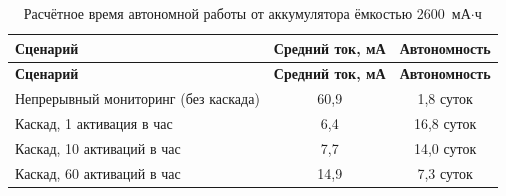 \begin{longtable}{|p{6cm}|c|c|}
	\caption{Расчётное время автономной работы от аккумулятора ёмкостью 2600~мА$\cdot$ч}
	\label{tab:autonomy}                                                                    \\
	\hline
	\textbf{Сценарий}                    & \textbf{Средний ток, мА} & \textbf{Автономность} \\
	\hline
	\endfirsthead
	\hline
	\textbf{Сценарий}                    & \textbf{Средний ток, мА} & \textbf{Автономность} \\
	\hline
	\endhead
	\hline
	\endfoot
	Непрерывный мониторинг (без каскада) & 60,9                     & 1,8 суток             \\ \hline
	Каскад, 1 активация в час            & 6,4                      & 16,8 суток            \\ \hline
	Каскад, 10 активаций в час           & 7,7                      & 14,0 суток            \\ \hline
	Каскад, 60 активаций в час           & 14,9                     & 7,3 суток             \\
	\hline
\end{longtable}
